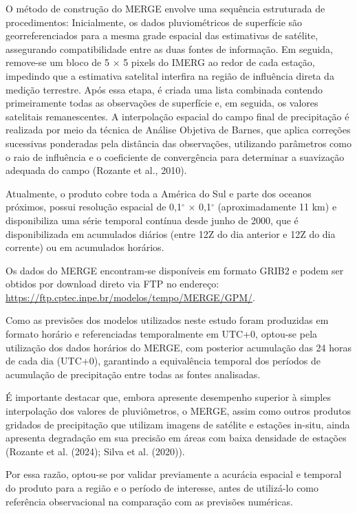 \documentclass[12pt,a4paper,oneside]{book}
\begin{document}
O método de construção do MERGE envolve uma sequência estruturada de procedimentos: Inicialmente, os dados pluviométricos de superfície são georreferenciados para a mesma grade espacial das estimativas de satélite, assegurando compatibilidade entre as duas fontes de informação. Em seguida, remove-se um bloco de 5 $\times$ 5 pixels do IMERG ao redor de cada estação, impedindo que a estimativa satelital interfira na região de influência direta da medição terrestre. Após essa etapa, é criada uma lista combinada contendo primeiramente todas as observações de superfície e, em seguida, os valores satelitais remanescentes. A interpolação espacial do campo final de precipitação é realizada por meio da técnica de Análise Objetiva de Barnes, que aplica correções sucessivas ponderadas pela distância das observações, utilizando parâmetros como o raio de influência e o coeficiente de convergência para determinar a suavização adequada do campo (Rozante et al., 2010).

Atualmente, o produto cobre toda a América do Sul e parte dos oceanos próximos, possui resolução espacial de 0,1$^\circ$ $\times$ 0,1$^\circ$ (aproximadamente 11 km) e disponibiliza uma série temporal contínua desde junho de 2000, que é disponibilizada em acumulados diários (entre 12Z do dia anterior e 12Z do dia corrente) ou em acumulados horários.

Os dados do MERGE encontram-se disponíveis em formato GRIB2 e podem ser obtidos por download direto via FTP no endereço: \textcolor{red}{\url{https://ftp.cptec.inpe.br/modelos/tempo/MERGE/GPM/}}.

Como as previsões dos modelos utilizados neste estudo foram produzidas em formato horário e referenciadas temporalmente em UTC+0, optou-se pela utilização dos dados horários do MERGE, com posterior acumulação das 24 horas de cada dia (UTC+0), garantindo a equivalência temporal dos períodos de acumulação de precipitação entre todas as fontes analisadas.

É importante destacar que, embora apresente desempenho superior à simples interpolação dos valores de pluviômetros, o MERGE, assim como outros produtos gridados de precipitação que utilizam imagens de satélite e estações in-situ, ainda apresenta degradação em sua precisão em áreas com baixa densidade de estações (Rozante et al. (2024); Silva et al. (2020)).

Por essa razão, optou-se por validar previamente a acurácia espacial e temporal do produto para a região e o período de interesse, antes de utilizá-lo como referência observacional na comparação com as previsões numéricas.
\end{document}
